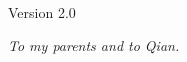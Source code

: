 
\hfill
\vfill
\noindent\myName \\
\textit{\let\\\relax\myTitle} \\
\textcopyright\ \myYear \\
Version 2.0

\newpage
\vspace*{\fill}
\begin{flushright}
	\textit{To my parents and to Qian.}
\end{flushright}
\vspace*{\fill}
